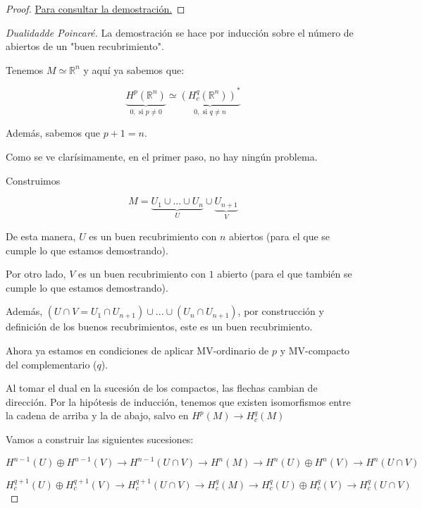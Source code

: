 \documentclass[palatino, bibnumbers]{apuntes}
\begin{document}
\begin{proof}
\href{https://es.wikipedia.org/wiki/Lema_de_los_cinco}{Para consultar la demostración.}
\end{proof}

\begin{proof}[Dualidad\IS de Poincaré]

La demostración se hace por inducción sobre el número de abiertos de un "buen recubrimiento".


Tenemos $M \simeq ℝ^n$ y aquí ya sabemos que:

\[
	\underbrace{H^p(ℝ^n)}_{0, \text{ si }p≠0} \simeq \underbrace{\left(H_c^q(ℝ^n)\right)^{\ast}}_{0,\text{ si } q≠n}
\]

Además, sabemos que $p+1 = n$.

Como se ve clarísimamente, en el primer paso, no hay ningún problema.



Construimos

\[
	M = \underbrace{U_1 \cup ... \cup U_n}_{U} \cup \underbrace{U_{n+1}}_{V}
\]

De esta manera, $U$ es un buen recubrimiento con $n$ abiertos (para el que se cumple lo que estamos demostrando).

Por otro lado, $V$ es un buen recubrimiento con $1$ abierto (para el que también se cumple lo que estamos demostrando).

Además, $(U\cap V = U_1\cap U_{n+1})\cup ... \cup (U_n\cap U_{n+1})$, por construcción y definición de los buenos recubrimientos, este es un buen recubrimiento.

Ahora ya estamos en condiciones de aplicar MV-ordinario de $p$ y MV-compacto del complementario ($q$).

Al tomar el dual en la sucesión de los compactos, las flechas cambian de dirección. Por la hipótesis de inducción, tenemos que existen isomorfismos entre la cadena de arriba y la de abajo, salvo en $H^p(M) \to H^q_c(M)$

Vamos a construir las siguientes sucesiones:

\begin{equation*}
\label{absurdo:1}
H^{n-1}(U) \oplus H^{n-1}(V) \to H^{n-1}(U\cap V) \to H^n(M) \to H^{n}(U)\oplus H^n(V) \to H^n(U\cap V)
\end{equation*}

\begin{equation}
\label{absurdo:2}
H_c^{q+1}(U) \oplus H_c^{q+1}(V) \to H_c^{q+1}(U\cap V) \to H_c^q(M) \to H_c^{q}(U)\oplus H_c^q(V) \to H_c^q(U\cap V)
\end{equation}


\end{proof}
\end{document}

